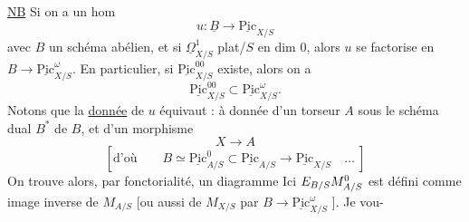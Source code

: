 \uline{NB} Si on a un hom
\[
u:\underline{B}\longrightarrow\underline{\mathrm{Pic}}_{X/S}
\]
avec $B$ un schéma abélien, et si $\underline{\Omega}^1_{X/S}$  plat/$S$ en dim 0, alors $u$ se factorise en $B\longrightarrow\underline{\mathrm{Pic}}^\omega_{X/S}$. En particulier, si $\underline{\mathrm{Pic}}^{00}_{X/S}$ existe, alors on a
\[
\underline{\mathrm{Pic}}^{00}_{X/S}\subset\underline{\mathrm{Pic}}^\omega_{X/S}.
\]
Notons que la \uline{donnée} de $u$ équivaut : à  donnée d'un torseur $A$ sous  le schéma dual $B^*$ de $B$, et d'un morphisme
\[
X\longrightarrow A
\]
\[
[\text{d'où}\qquad B\simeq\underline{\mathrm{Pic}}^0_{A/S}\subset\underline{\mathrm{Pic}}_{A/S}\longrightarrow\underline{\mathrm{Pic}}_{X/S}\quad\ldots\ ]
\]
On trouve alors, par fonctorialité, un diagramme
Ici $E_{B/S}M^0_{A/S}$ est défini comme image inverse de $M_{A/S}$  [ou aussi de $M_{X/S}$ par $B\longrightarrow\underline{\mathrm{Pic}}^\omega_{X/S}$ ]. Je vou-
